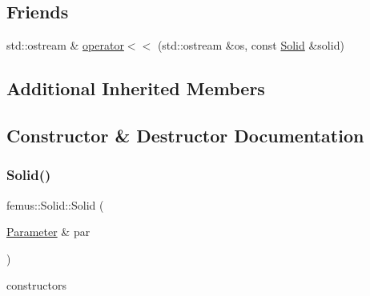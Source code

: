 \subsection*{Friends}
\begin{DoxyCompactItemize}
\item 
std\+::ostream \& \mbox{\hyperlink{classfemus_1_1_solid_a22707c24a86d849cae294b1d0dea3571}{operator$<$$<$}} (std\+::ostream \&os, const \mbox{\hyperlink{classfemus_1_1_solid}{Solid}} \&solid)
\end{DoxyCompactItemize}
\subsection*{Additional Inherited Members}


\subsection{Constructor \& Destructor Documentation}
\mbox{\label{classfemus_1_1_solid_a07969055ed742f25e4056549bb068cb4}} 
\subsubsection{\texorpdfstring{Solid()}{Solid()}\hspace{0.1cm}{\footnotesize\ttfamily [1/3]}}
{\footnotesize\ttfamily femus\+::\+Solid\+::\+Solid (\begin{DoxyParamCaption}\item[{\mbox{\hyperlink{classfemus_1_1_parameter}{Parameter}} \&}]{par }\end{DoxyParamCaption})}

constructors \mbox{\label{classfemus_1_1_solid_a0d8044c8b1ef2b972975dfb5d7378b9a}} 
